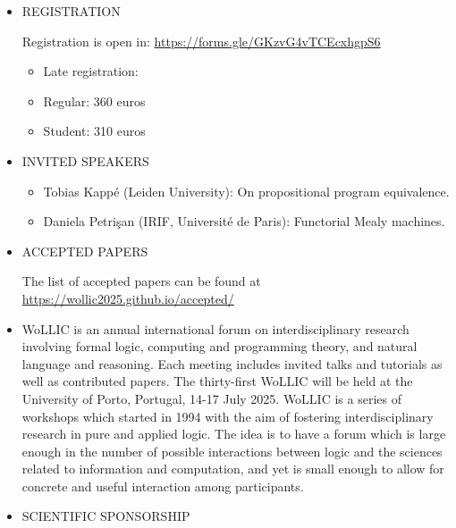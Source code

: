 \documentclass[prodmode,acmtecs]{acmsmall} %
\begin{document}
\begin{itemize}\item  REGISTRATION 
 
  Registration is open in: \href{https://forms.gle/GKzvG4vTCEcxhgpS6}{https://forms.gle/GKzvG4vTCEcxhgpS6} 
 
\begin{itemize}\item  Late registration:
\item Regular: 360 euros
\item Student: 310 euros
\end{itemize} 
\item  INVITED SPEAKERS 
 
\begin{itemize}\item  Tobias Kappé (Leiden University): On propositional program equivalence.
\item  Daniela Petrişan (IRIF, Université de Paris): Functorial Mealy machines.
\end{itemize} 
\item  ACCEPTED PAPERS 
 
  The list of accepted papers can be found at \href{https://wollic2025.github.io/accepted/}{https://wollic2025.github.io/accepted/} 
 
\item  WoLLIC is an annual international forum on interdisciplinary research involving formal logic, computing and programming theory, and natural language and reasoning. Each meeting includes invited talks and tutorials as well as contributed papers. The thirty-first WoLLIC will be held at the University of Porto, Portugal, 14-17 July 2025. WoLLIC is a series of workshops which started in 1994 with the aim of fostering interdisciplinary research in pure and applied logic. The idea is to have a forum which is large enough in the number of possible interactions between logic and the sciences related to information and computation, and yet is small enough to allow for concrete and useful interaction among participants. 
 
\item  SCIENTIFIC SPONSORSHIP 
 

\end{itemize}
\end{document}
